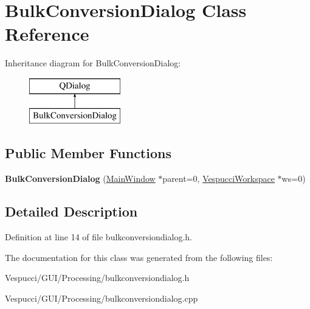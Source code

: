 \hypertarget{class_bulk_conversion_dialog}{}\section{Bulk\+Conversion\+Dialog Class Reference}
\label{class_bulk_conversion_dialog}
Inheritance diagram for Bulk\+Conversion\+Dialog\+:\begin{figure}[H]
\begin{center}
\leavevmode
\includegraphics[height=2.000000cm]{class_bulk_conversion_dialog}
\end{center}
\end{figure}
\subsection*{Public Member Functions}
\begin{DoxyCompactItemize}
\item 
{\bfseries Bulk\+Conversion\+Dialog} (\hyperlink{class_main_window}{Main\+Window} $\ast$parent=0, \hyperlink{class_vespucci_workspace}{Vespucci\+Workspace} $\ast$ws=0)\hypertarget{class_bulk_conversion_dialog_ab7e3672dd71ab128e35f68cf9f155a89}{}\label{class_bulk_conversion_dialog_ab7e3672dd71ab128e35f68cf9f155a89}

\end{DoxyCompactItemize}


\subsection{Detailed Description}


Definition at line 14 of file bulkconversiondialog.\+h.



The documentation for this class was generated from the following files\+:\begin{DoxyCompactItemize}
\item 
Vespucci/\+G\+U\+I/\+Processing/bulkconversiondialog.\+h\item 
Vespucci/\+G\+U\+I/\+Processing/bulkconversiondialog.\+cpp\end{DoxyCompactItemize}
